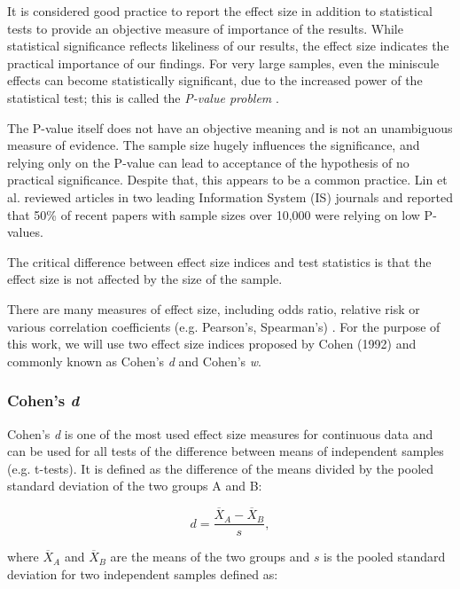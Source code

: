 It is considered good practice to report the effect size in addition to statistical tests to provide an objective measure of importance of the results. While statistical significance reflects likeliness of our results, the effect size indicates the practical importance of our findings. For very large samples, even the miniscule effects can become statistically significant, due to the increased power of the statistical test; this is called the \textit{P-value problem} \cite{pvalueproblem}. 

The P-value itself does not have an objective meaning and is not an unambiguous measure of evidence. The sample size hugely influences the significance, and relying only on the P-value can lead to acceptance of the hypothesis of no practical significance. Despite that, this appears to be a common practice. Lin et al. \cite{pvalueproblem} reviewed articles in two leading Information System (IS) journals and reported that 50\% of recent papers with sample sizes over 10,000 were relying on low P-values.

The critical difference between effect size indices and test statistics is that the effect size is not affected by the size of the sample.

There are many measures of effect size, including odds ratio, relative risk or various correlation coefficients (e.g. Pearson's, Spearman's) \cite{effect_sizes}. For the purpose of this work, we will use two effect size indices proposed by Cohen (1992) \cite{cohen} and commonly known as Cohen's \textit{d} and Cohen's \textit{w}.

\subsubsection{Cohen's \textit{d}}

Cohen's \textit{d} is one of the most used effect size measures for continuous data and can be used for all tests of the difference between means of independent samples (e.g. t-tests). It is defined as the difference of the means divided by the pooled standard deviation of the two groups A and B: \cite{cohen_book}

\begin{equation}
d = \frac{\overline{X}_A-\overline{X}_B}{s} ,
\end{equation}

where $\overline{X}_A$ and $\overline{X}_B$ are the means of the two groups and $s$ is the pooled standard deviation for two independent samples defined as:

